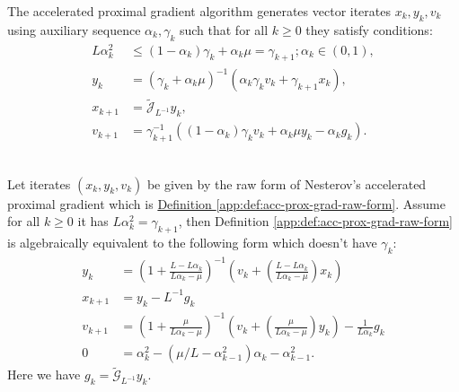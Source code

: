\documentclass[12pt]{article}
\begin{document}
    \begin{definition}
    \label{app:def:acc-prox-grad-raw-form}
        The accelerated proximal gradient algorithm generates vector iterates $x_k, y_k, v_k$ using auxiliary sequence $\alpha_k, \gamma_k$ such that for all $k\ge0$ they satisfy conditions: 
        \begin{align*}
            L\alpha_k^2 
            &\le 
            (1 - \alpha_k)\gamma_k + \alpha_k\mu = \gamma_{k + 1}; \alpha_k \in (0, 1), 
            \\
            y_k &= (\gamma_k + \alpha_k \mu)^{-1}
            (\alpha_k \gamma_k v_k + \gamma_{k + 1}x_k),
            \\
            x_{k + 1}&= 
            \widetilde{\mathcal J}_{L^{-1}} y_k, 
            \\
            v_{k + 1} &= 
            \gamma_{k + 1}^{-1}
            \left(
                (1 - \alpha_k)\gamma_k v_k + \alpha_k \mu y_k - \alpha_k g_k
            \right). 
        \end{align*}
    \end{definition}
    \begin{theorem}\label{app:theorem:acc-prox-grad-intermediate}\; \\
        Let iterates $(x_k, y_k, v_k)$ be given by the raw form of Nesterov's accelerated proximal gradient which is 
        \hyperref[app:def:acc-prox-grad-raw-form]{Definition \ref*{app:def:acc-prox-grad-raw-form}}. 
        Assume for all $k \ge 0$ it has $L\alpha_k^2 = \gamma_{k + 1}$, then Definition \ref*{app:def:acc-prox-grad-raw-form} is algebraically equivalent to the following form which doesn't have $\gamma_k$: 
        \begin{align*}
            y_k &= 
            \left(
                1 + \frac{L - L\alpha_k}{L\alpha_k - \mu}
            \right)^{-1}
            \left(
                v_k + 
                \left(\frac{L - L\alpha_k}{L\alpha_k - \mu} \right) x_k
            \right)
            \\
            x_{k + 1} &= 
            y_k - L^{-1}  g_k
            \\
            v_{k + 1} &= 
            \left(
                1 + \frac{\mu}{L \alpha_k - \mu}
            \right)^{-1}
            \left(
                v_k + 
                \left(\frac{\mu}{L \alpha_k - \mu}\right) y_k
            \right) - \frac{1}{L\alpha_{k}} g_k
            \\
            0 &= \alpha_k^2 - \left(\mu/L - \alpha_{k -1}^2\right) \alpha_k - \alpha_{k - 1}^2. 
        \end{align*}
        Here we have $g_k = \widetilde{\mathcal G}_{L^{-1}}y_k$. 
    \end{theorem}
\end{document}
